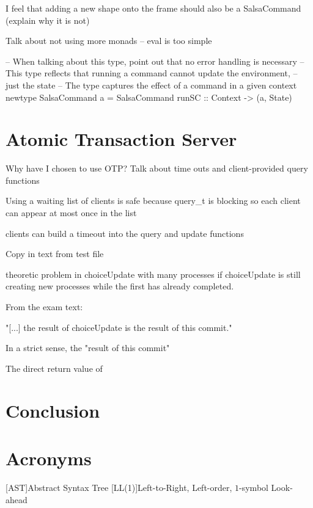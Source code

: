 \documentclass[
paper=a4,
oneside,
fontsize=11pt,
numbers=noenddot,
headinclude=false, %
footinclude=false, %
fleqn,             %
DIV=8
]{scrartcl}
\newcommand{\acrofont}[1]{\textrm{\textmd{#1}}}
\begin{document}
I feel that adding a new shape onto the frame should also be a SalsaCommand
(explain why it is not)

Talk about not using more monads -- eval is too simple

-- When talking about this type, point out that no error handling is necessary
-- This type reflects that running a command cannot update the environment,
-- just the state
-- The type captures the effect of a command in a given context
newtype SalsaCommand a = SalsaCommand { runSC :: Context -> (a, State) }

\section{Atomic Transaction Server}

Why have I chosen to use OTP?
Talk about time outs and client-provided query functions

Using a waiting list of clients is safe because query\_t is blocking so each
client can appear at most once in the list

clients can build a timeout into the query and update functions

Copy in text from test file

theoretic problem in choiceUpdate with many processes if choiceUpdate is still
creating new processes while the first has already completed.

From the exam text:

"[...] the result of choiceUpdate is the result of this commit."

In a strict sense, the "result of this commit" 

The direct return value of 

\section{Conclusion}





\section*{Acronyms}
\begin{acronym}[DRY]
  [\acrofont{AST}]{Abstract Syntax Tree}
  [\acrofont{{\regnum LL(1)}}]{Left-to-Right, Left-order, $1$-symbol Look-ahead}
\end{acronym}
\end{document}
